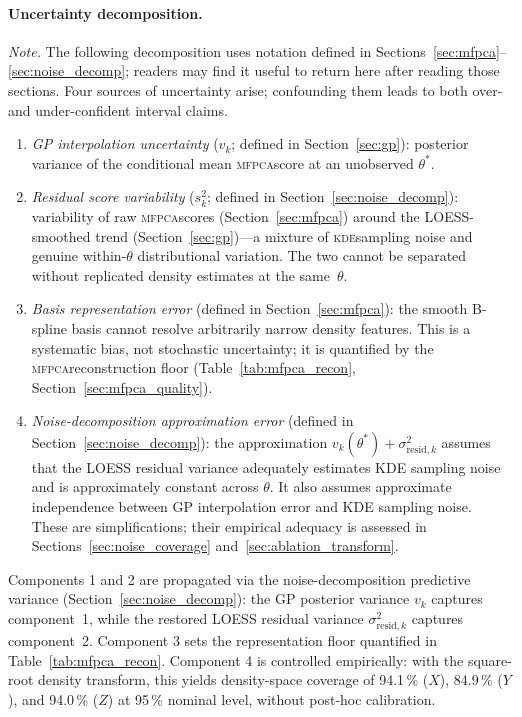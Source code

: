 \documentclass[12pt,a4paper]{article}
\newcommand{\MFPCA}{\textsc{mfpca}}
\newcommand{\KDE}{\textsc{kde}}
\newcommand{\spar}{\theta}
\begin{document}
\paragraph{Uncertainty decomposition.}
\textit{Note.} The following decomposition uses notation defined in
Sections~\ref{sec:mfpca}--\ref{sec:noise_decomp}; readers may find it useful
to return here after reading those sections.
Four sources of uncertainty arise; confounding them leads to both
over- and under-confident interval claims.
\begin{enumerate}
  \item \emph{GP interpolation uncertainty} ($v_k$; defined in
        Section~\ref{sec:gp}): posterior variance of the conditional
        mean \MFPCA score at an unobserved $\spar^*$.
  \item \emph{Residual score variability} ($s_k^2$; defined in
        Section~\ref{sec:noise_decomp}): variability of raw \MFPCA scores
        (Section~\ref{sec:mfpca}) around the LOESS-smoothed trend
        (Section~\ref{sec:gp})---a mixture of \KDE sampling noise
        and genuine within-$\spar$ distributional variation.  The two
        cannot be separated without replicated density estimates at
        the same~$\spar$.
  \item \emph{Basis representation error} (defined in
        Section~\ref{sec:mfpca}): the smooth B-spline basis cannot
        resolve arbitrarily narrow density features.  This is a
        systematic bias, not stochastic uncertainty; it is quantified
        by the \MFPCA reconstruction floor (Table~\ref{tab:mfpca_recon},
        Section~\ref{sec:mfpca_quality}).
  \item \emph{Noise-decomposition approximation error} (defined in
        Section~\ref{sec:noise_decomp}): the approximation
        $v_k(\spar^*)+\sigma^2_{\mathrm{resid},k}$ assumes that the
        LOESS residual variance adequately estimates KDE sampling noise
        and is approximately constant across $\spar$.  It also assumes
        approximate independence between GP interpolation error and KDE
        sampling noise.  These are simplifications; their empirical
        adequacy is assessed in
        Sections~\ref{sec:noise_coverage} and~\ref{sec:ablation_transform}.
\end{enumerate}
Components 1 and 2 are propagated via the noise-decomposition
predictive variance (Section~\ref{sec:noise_decomp}): the GP posterior variance
$v_k$ captures component~1, while the restored LOESS residual variance
$\sigma^2_{\mathrm{resid},k}$ captures component~2.
Component 3 sets the representation floor quantified in
Table~\ref{tab:mfpca_recon}.  Component 4 is controlled empirically:
with the square-root density transform, this yields density-space
coverage of 94.1\,\% ($X$), 84.9\,\% ($Y$), and 94.0\,\% ($Z$) at
95\,\% nominal level, without post-hoc calibration.
\end{document}
